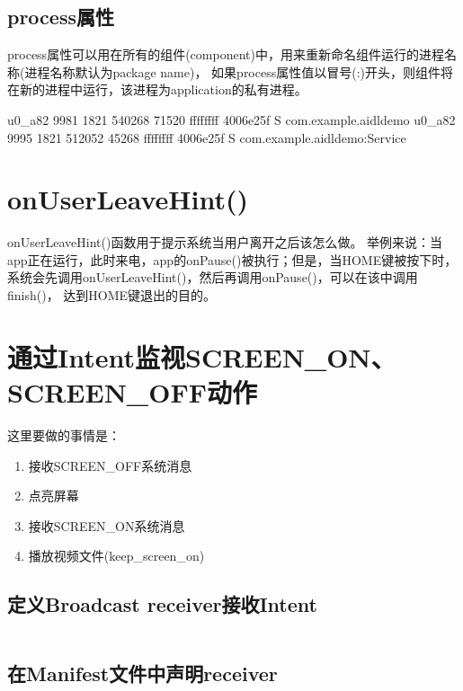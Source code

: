 ﻿\documentclass[a4paper,11pt]{article}
\begin{document}
  \subsection[process属性]{process属性}
  process属性可以用在所有的组件(component)中，用来重新命名组件运行的进程名称(进程名称默认为package name)，
  如果process属性值以冒号(:)开头，则组件将在新的进程中运行，该进程为application的私有进程。\par  
  \begin{bashcode}
u0_a82    9981  1821  540268 71520 ffffffff 4006e25f S com.example.aidldemo
u0_a82    9995  1821  512052 45268 ffffffff 4006e25f S com.example.aidldemo:Service
  \end{bashcode}

  \section[onUserLeaveHint()]{onUserLeaveHint()}
  onUserLeaveHint()函数用于提示系统当用户离开之后该怎么做。
  举例来说：当app正在运行，此时来电，app的onPause()被执行；但是，当HOME键被按下时，
  系统会先调用onUserLeaveHint()，然后再调用onPause()，可以在该中调用finish()，
  达到HOME键退出的目的。

  \section[通过Intent监视SCREEN\_ON、SCREEN\_OFF动作]{通过Intent监视SCREEN\_ON、SCREEN\_OFF动作}
  这里要做的事情是：
  \begin{enumerate}
    \item 接收SCREEN\_OFF系统消息
    \item 点亮屏幕
    \item 接收SCREEN\_ON系统消息
    \item 播放视频文件(keep\_screen\_on)
  \end{enumerate}
  \subsection[定义Broadcast receiver接收Intent]{定义Broadcast receiver接收Intent}
  \inputminted[linenos,tabsize=4,bgcolor=srcbg,fontsize=\small]{java}{ScreenBroadcastReceiver.java}

  \subsection[在Manifest文件中声明receiver]{在Manifest文件中声明receiver}
  \inputminted[linenos,tabsize=4,bgcolor=srcbg]{xml}{AndroidManifest.xml}
\end{document}
